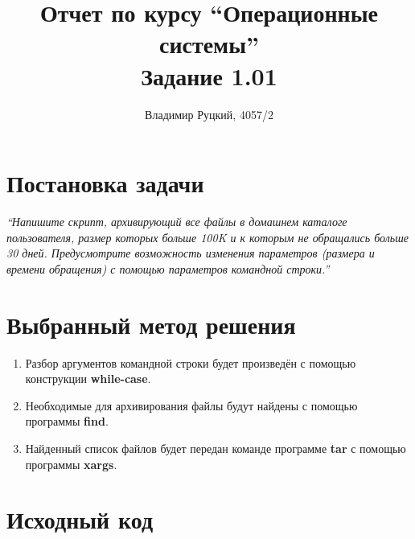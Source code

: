 \documentclass[a4paper,12pt]{article}
\title{Отчет по курсу ``Операционные системы'' \\ Задание 1.01}
\author{Владимир Руцкий, 4057/2}
\newcommand{\commandquote}[1]{\textbf{#1}}
\begin{document}
\maketitle

\section*{Постановка задачи}
\textit{``Напишите скрипт, архивирующий все файлы в домашнем каталоге пользователя,
размер которых больше 100K и к которым не обращались больше 30 дней.
Предусмотрите возможность изменения параметров (размера и времени
обращения) с помощью параметров командной строки.''}

\section*{Выбранный метод решения}
\begin{enumerate}
 \item Разбор аргументов командной строки будет произведён с помощью конструкции \commandquote{while-case}.
 \item Необходимые для архивирования файлы будут найдены с помощью программы \commandquote{find}.
 \item Найденный список файлов будет передан команде программе \commandquote{tar} 
с помощью программы \commandquote{xargs}.
\end{enumerate}

\section*{Исходный код}
\lstset{language=bash, caption=task\_1\_01.sh,%
label=source-code, basicstyle=\footnotesize,%
numbers=left, numberstyle=\footnotesize, numbersep=5pt, frame=single, breaklines=true, breakatwhitespace=false,%
inputencoding=utf8x}

\end{document}
